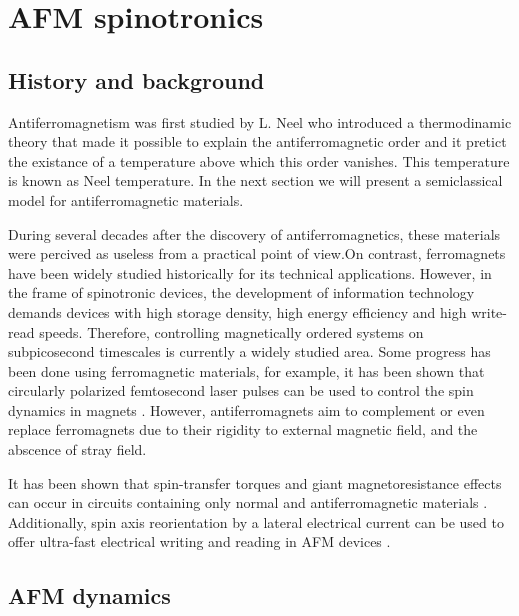 \chapter{AFM spinotronics}

\section{History and background}

Antiferromagnetism was first studied by L. Neel who introduced a thermodinamic theory that made it possible to explain the antiferromagnetic order and it pretict the existance of a temperature above which this order vanishes. This temperature is known as Neel temperature. In the next section we will present a semiclassical model for antiferromagnetic materials.

During several decades after the discovery of antiferromagnetics, these materials were percived as useless from a practical point of view.On contrast, ferromagnets have been widely studied historically for its technical applications. However, in the frame of spinotronic devices, the development of information technology demands devices with high storage density, high energy efficiency and high write-read speeds. Therefore, controlling magnetically ordered systems on subpicosecond timescales is currently a widely studied area. Some progress has been done using ferromagnetic materials, for example, it has been shown that circularly polarized femtosecond laser pulses can be used to control the spin dynamics in magnets \cite{Kimel2005}. However, antiferromagnets aim to complement or even replace ferromagnets due to their rigidity to external magnetic field, and the abscence of stray field.

It has been shown that spin-transfer torques and giant magnetoresistance effects can occur in circuits containing only normal and antiferromagnetic materials \cite{MacDonald2011}. Additionally, spin axis reorientation by a lateral electrical current can be used to offer ultra-fast electrical writing and reading in AFM devices \cite{Zelezny2014}.

\section{AFM dynamics}
